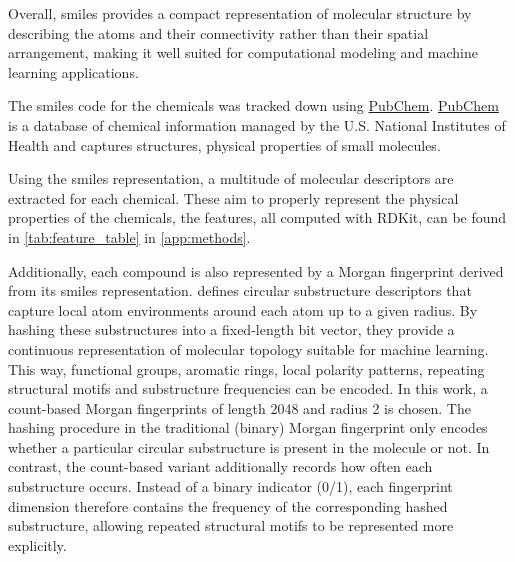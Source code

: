 Overall, \gls{smiles} provides a compact representation of molecular structure by describing the atoms and their connectivity rather than their spatial arrangement, making it well suited for computational modeling and machine learning applications.

The \gls{smiles} code for the chemicals was tracked down using \href{https://pubchem.ncbi.nlm.nih.gov/}{PubChem}. \href{https://pubchem.ncbi.nlm.nih.gov/}{PubChem} is a database of chemical information managed by the U.S. National Institutes of Health and captures structures, physical properties of small molecules. 

Using the \gls{smiles} representation, a multitude of molecular descriptors are extracted for each chemical. These aim to properly represent the physical properties of the chemicals, the features, all computed with RDKit, can be found in \autoref{tab:feature_table} in \autoref{app:methods}.

Additionally, each compound is also represented by a Morgan fingerprint derived from its \gls{smiles} representation. \citet{Morgan1965} defines circular substructure descriptors that capture local atom environments around each atom up to a given radius. By hashing these substructures into a fixed-length bit vector, they provide a continuous representation of molecular topology suitable for machine learning. This way, functional groups, aromatic rings, local polarity patterns, repeating structural motifs and substructure frequencies can be encoded. In this work, a count-based Morgan fingerprints of length 2048 and radius 2 is chosen. The hashing procedure in the traditional (binary) Morgan fingerprint only encodes whether a particular circular substructure is present in the molecule or not. In contrast, the count-based variant additionally records how often each substructure occurs. Instead of a binary indicator (0/1), each fingerprint dimension therefore contains the frequency of the corresponding hashed substructure, allowing repeated structural motifs to be represented more explicitly.
